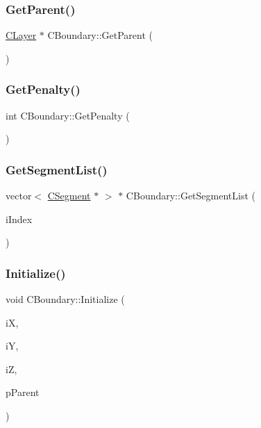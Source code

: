 \subsubsection{\texorpdfstring{GetParent()}{GetParent()}}
{\footnotesize\ttfamily \mbox{\hyperlink{classCLayer}{C\+Layer}} $\ast$ C\+Boundary\+::\+Get\+Parent (\begin{DoxyParamCaption}{ }\end{DoxyParamCaption})}

\mbox{\label{classCBoundary_ad21081690462e7f63ec76aa90db0936b}} 
\subsubsection{\texorpdfstring{GetPenalty()}{GetPenalty()}}
{\footnotesize\ttfamily int C\+Boundary\+::\+Get\+Penalty (\begin{DoxyParamCaption}{ }\end{DoxyParamCaption})}

\mbox{\label{classCBoundary_a3d96c4869c86bae2cd7bb88df47be984}} 
\subsubsection{\texorpdfstring{GetSegmentList()}{GetSegmentList()}}
{\footnotesize\ttfamily vector$<$ \mbox{\hyperlink{classCSegment}{C\+Segment}} $\ast$ $>$ $\ast$ C\+Boundary\+::\+Get\+Segment\+List (\begin{DoxyParamCaption}\item[{int}]{i\+Index }\end{DoxyParamCaption})}

\mbox{\label{classCBoundary_a17bf8019eff54892a398e4b13c3ff264}} 
\subsubsection{\texorpdfstring{Initialize()}{Initialize()}}
{\footnotesize\ttfamily void C\+Boundary\+::\+Initialize (\begin{DoxyParamCaption}\item[{int}]{iX,  }\item[{int}]{iY,  }\item[{int}]{iZ,  }\item[{\mbox{\hyperlink{classCLayer}{C\+Layer}} $\ast$}]{p\+Parent }\end{DoxyParamCaption})\hspace{0.3cm}{\ttfamily [virtual]}}



